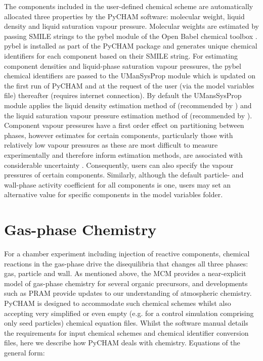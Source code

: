\documentclass[gmd, manuscript]{copernicus}
\begin{document}
The components included in the user-defined chemical scheme are automatically allocated three properties by the PyCHAM software: molecular weight, liquid density and liquid saturation vapour pressure.  Molecular weights are  estimated by passing SMILE strings to the pybel module of the Open Babel chemical toolbox \citep{OBoyle2011}.  pybel is installed as part of the PyCHAM package and generates unique chemical identifiers for each component based on their SMILE string.  For estimating component densities and liquid-phase saturation vapour pressures, the pybel chemical identifiers are passed to the UManSysProp module \citep{Topping2016} which is updated on the first run of PyCHAM and at the request of the user (via the model variables file) thereafter (requires internet connection).  By default the UMansSysProp module applies the liquid density estimation method of \citet{Girolami1994} (recommended by \citet{Barley2013}) and the liquid saturation vapour pressure estimation method of \citet{Nannoolal2008} (recommended by \citet{OMeara2014}).  Component vapour pressures have a first order effect on partitioning between phases, however estimates for certain components, particularly those with relatively low vapour pressures as these are most difficult to measure experimentally and therefore inform estimation methods,  are associated with considerable uncertainty \citep{OMeara2014}.  Consequently, users can also specify the vapour pressures of certain components.  Similarly, although the default particle- and wall-phase activity coefficient for all components is one, users may set an alternative value for specific components in the model variables folder.

\section{Gas-phase Chemistry}\label{sec:photochem}

For a chamber experiment including injection of reactive components, chemical reactions in the gas-phase drive the disequilibria that changes all three phases: gas, particle and wall.  As mentioned above, the MCM provides a near-explicit model of gas-phase chemistry for several organic precursors, and developments such as PRAM \citep{Roldin2019} provide updates to our understanding of atmospheric chemistry.  PyCHAM is designed to accommodate such chemical schemes whilst also accepting very simplified or even empty (e.g. for a control simulation comprising only seed particles) chemical equation files.  Whilst the software manual details the requirements for input chemical schemes and chemical identifier conversion files, here we describe how PyCHAM deals with chemistry.  Equations of the general form:
\end{document}
